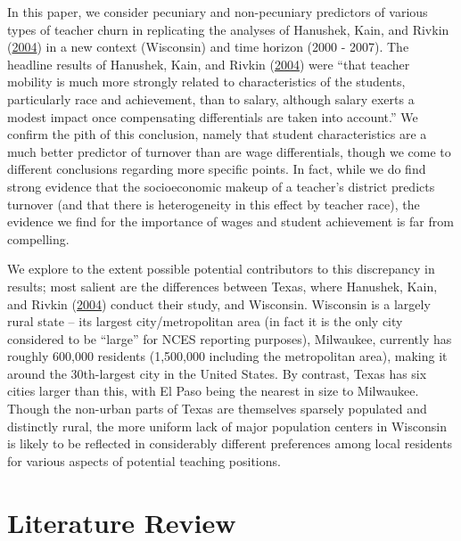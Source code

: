 \documentclass[12pt,]{article}
\begin{document}
In this paper, we consider pecuniary and non-pecuniary predictors of
various types of teacher churn in replicating the analyses of Hanushek,
Kain, and Rivkin (\protect\hyperlink{ref-hanushek}{2004}) in a new
context (Wisconsin) and time horizon (2000 - 2007). The headline results
of Hanushek, Kain, and Rivkin (\protect\hyperlink{ref-hanushek}{2004})
were ``that teacher mobility is much more strongly related to
characteristics of the students, particularly race and achievement, than
to salary, although salary exerts a modest impact once compensating
differentials are taken into account.'' We confirm the pith of this
conclusion, namely that student characteristics are a much better
predictor of turnover than are wage differentials, though we come to
different conclusions regarding more specific points. In fact, while we
do find strong evidence that the socioeconomic makeup of a teacher's
district predicts turnover (and that there is heterogeneity in this
effect by teacher race), the evidence we find for the importance of
wages and student achievement is far from compelling.

We explore to the extent possible potential contributors to this
discrepancy in results; most salient are the differences between Texas,
where Hanushek, Kain, and Rivkin
(\protect\hyperlink{ref-hanushek}{2004}) conduct their study, and
Wisconsin. Wisconsin is a largely rural state -- its largest
city/metropolitan area (in fact it is the only city considered to be
``large'' for NCES reporting purposes), Milwaukee, currently has roughly
600,000 residents (1,500,000 including the metropolitan area), making it
around the 30th-largest city in the United States. By contrast, Texas
has six cities larger than this, with El Paso being the nearest in size
to Milwaukee. Though the non-urban parts of Texas are themselves
sparsely populated and distinctly rural, the more uniform lack of major
population centers in Wisconsin is likely to be reflected in
considerably different preferences among local residents for various
aspects of potential teaching positions.

\section{Literature Review}\label{literature-review}
\end{document}
